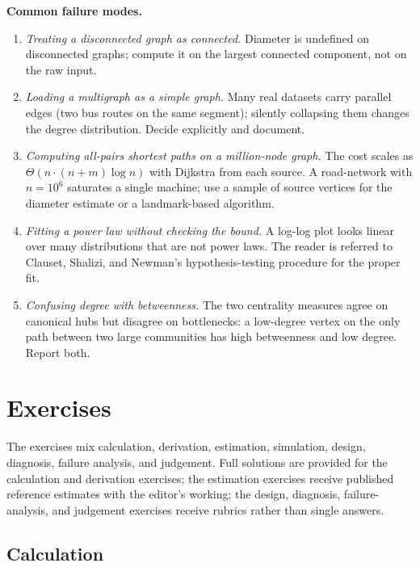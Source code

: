 \begin{project}
\textbf{Common failure modes.}
\begin{enumerate}[leftmargin=*]
  \item \textit{Treating a disconnected graph as connected.}
    Diameter is undefined on disconnected graphs; compute it on the
    largest connected component, not on the raw input.
  \item \textit{Loading a multigraph as a simple graph.} Many real
    datasets carry parallel edges (two bus routes on the same
    segment); silently collapsing them changes the degree
    distribution. Decide explicitly and document.
  \item \textit{Computing all-pairs shortest paths on a million-node
    graph.} The cost scales as $\Theta(n \cdot (n + m) \log n)$
    with Dijkstra from each source. A road-network with $n = 10^{6}$
    saturates a single machine; use a sample of source vertices for
    the diameter estimate or a landmark-based algorithm.
  \item \textit{Fitting a power law without checking the bound.} A
    log-log plot looks linear over many distributions that are not
    power laws. The reader is referred to Clauset, Shalizi, and
    Newman's hypothesis-testing procedure for the proper fit.
  \item \textit{Confusing degree with betweenness.} The two
    centrality measures agree on canonical hubs but disagree on
    bottlenecks: a low-degree vertex on the only path between two
    large communities has high betweenness and low degree. Report
    both.
\end{enumerate}
\end{project}

\section{Exercises}

The exercises mix calculation, derivation, estimation, simulation,
design, diagnosis, failure analysis, and judgement. Full solutions are provided
for the calculation and derivation exercises; the estimation
exercises receive published reference estimates with the editor's
working; the design, diagnosis, failure-analysis, and judgement
exercises receive rubrics rather than single answers.

\subsection*{Calculation}

